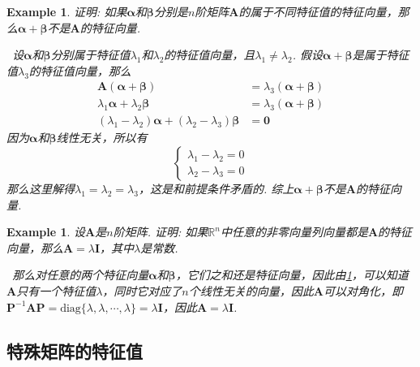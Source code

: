 \documentclass{article}
\newtheorem{example}[theorem]{Example}
\newcommand{\hints}{{\color{blue} \text{hints}}}
\newcommand{\mbf}[1]{\bm{#1}}
\begin{document}
\begin{example}\label{a+b-is-not-eigenvector}
\rm 证明: 如果$\mbf{\alpha}$和$\mbf{\beta}$分别是$n$阶矩阵$\mbf{A}$的属于不同特征值的特征向量，那么$\mbf{\alpha}+\mbf{\beta}$不是$\mbf{A}$的特征向量. 

\hints\ 设$\mbf{\alpha}$和$\mbf{\beta}$分别属于特征值$\lambda_1$和$\lambda_2$的特征值向量，且$\lambda_1 \neq \lambda_2$. 假设$\mbf{\alpha}+\mbf{\beta}$是属于特征值$\lambda_3$的特征值向量，那么
$$
\begin{array}{ll}
\mbf{A}(\mbf{\alpha}+\mbf{\beta}) &= \lambda_3(\mbf{\alpha}+\mbf{\beta}) \\
\lambda_1\mbf{\alpha}+\lambda_2\mbf{\beta} &= \lambda_3(\mbf{\alpha}+\mbf{\beta}) \\  
(\lambda_1 - \lambda_2)\mbf{\alpha} + (\lambda_2 - \lambda_3)\mbf{\beta} &= \mbf{0}
\end{array}
$$
因为$\mbf{\alpha}$和$\mbf{\beta}$线性无关，所以有
$$
\left\{
\begin{array}{ll}
\lambda_1 - \lambda_2 = 0\\
\lambda_2 - \lambda_3 = 0
\end{array}\right.
$$
那么这里解得$\lambda_1 = \lambda_2 = \lambda_3$，这是和前提条件矛盾的. 综上$\mbf{\alpha}+\mbf{\beta}$不是$\mbf{A}$的特征向量.
\end{example}

\begin{example}
\rm 设$\mbf{A}$是$n$阶矩阵. 证明: 如果$\mathbb{R}^n$中任意的非零向量列向量都是$\mbf{A}$的特征向量，那么$\mbf{A}=\lambda\mbf{I}$，其中$\lambda$是常数.

\hints\ 那么对任意的两个特征向量$\mbf{\alpha}$和$\mbf{\beta}$，它们之和还是特征向量，因此由\ref{a+b-is-not-eigenvector}，可以知道$\mbf{A}$只有一个特征值$\lambda$，同时它对应了$n$个线性无关的向量，因此$\mbf{A}$可以对角化，即$\mbf{P}^{-1}\mbf{A}\mbf{P} = \text{diag}\{\lambda,\lambda,\cdots,\lambda\} = \lambda\mbf{I}$，因此$\mbf{A} = \lambda\mbf{I}$.
\end{example}

\subsection{特殊矩阵的特征值}
\end{document}
